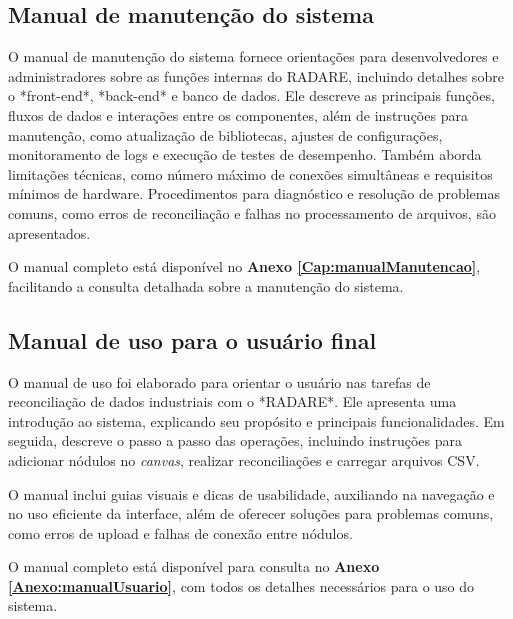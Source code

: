\subsection{Manual de manutenção do sistema}

O manual de manutenção do sistema fornece orientações para desenvolvedores e administradores sobre as funções internas do RADARE, incluindo detalhes sobre o *front-end*, *back-end* e banco de dados. Ele descreve as principais funções, fluxos de dados e interações entre os componentes, além de instruções para manutenção, como atualização de bibliotecas, ajustes de configurações, monitoramento de logs e execução de testes de desempenho. Também aborda limitações técnicas, como número máximo de conexões simultâneas e requisitos mínimos de hardware. Procedimentos para diagnóstico e resolução de problemas comuns, como erros de reconciliação e falhas no processamento de arquivos, são apresentados.

O manual completo está disponível no \textbf{Anexo \ref{Cap:manualManutencao}}, facilitando a consulta detalhada sobre a manutenção do sistema.

\subsection{Manual de uso para o usuário final}

O manual de uso foi elaborado para orientar o usuário nas tarefas de reconciliação de dados industriais com o *RADARE*. Ele apresenta uma introdução ao sistema, explicando seu propósito e principais funcionalidades. Em seguida, descreve o passo a passo das operações, incluindo instruções para adicionar nódulos no \textit{canvas}, realizar reconciliações e carregar arquivos CSV.

O manual inclui guias visuais e dicas de usabilidade, auxiliando na navegação e no uso eficiente da interface, além de oferecer soluções para problemas comuns, como erros de upload e falhas de conexão entre nódulos. 

O manual completo está disponível para consulta no \textbf{Anexo \ref{Anexo:manualUsuario}}, com todos os detalhes necessários para o uso do sistema.

